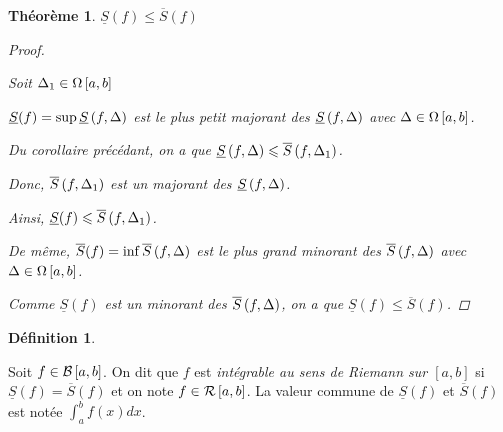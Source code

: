 \documentclass{report}
\newcommand*{\Ssup}[1]{\overline{S}(#1)}
\newcommand*{\Sinf}[1]{\underline{S}(#1)}
\newcommand*{\dint}[3]{\displaystyle\int_{#1}^{#2}#3}
\newcommand*{\lte}{\leqslant}
\newtheorem*{thm}{Th\'eor\`eme}
\theoremstyle{definition}
\newtheorem*{defin}{D\'efinition}
\theoremstyle{remark}
\begin{document}
	\begin{thm}
		$\Sinf{f} \lte \Ssup{f}$
		\begin{proof}~

			Soit $\Delta_1 \in \partitions$

			$\Sinf{f}=\sup\sinf{f}$ est le plus petit majorant des $\sinf{f}$ avec $\Delta \in \partitions$.

			Du corollaire pr\'ec\'edant, on a que $\sinf{f} \lte \ssup{f}[\Delta_1]$.

			Donc, $\ssup{f}[\Delta_1]$ est un majorant des $\sinf{f}$.

			Ainsi, $\Sinf{f} \lte \ssup{f}[\Delta_1]$.

			De m\^eme, $\Ssup{f}=\inf\ssup{f}$ est le plus grand minorant des $\ssup{f}$ avec $\Delta \in \partitions$.

			Comme $\Sinf{f}$ est un minorant des $\ssup{f}$, on a que $\Sinf{f} \lte \Ssup{f}$.
		\end{proof}
	\end{thm}

	\begin{defin}
		~

		Soit $f \in \bornee$. On dit que $f$ est \emph{int\'egrable au sens de Riemann sur $[a,b]$} si $\Sinf{f}=\Ssup{f}$ et on note $f \in \riemann$. La valeur commune de $\Sinf{f}$ et $\Ssup{f}$ est not\'ee $\dint{a}{b}{f(x)dx}$.
	\end{defin}
\end{document}
